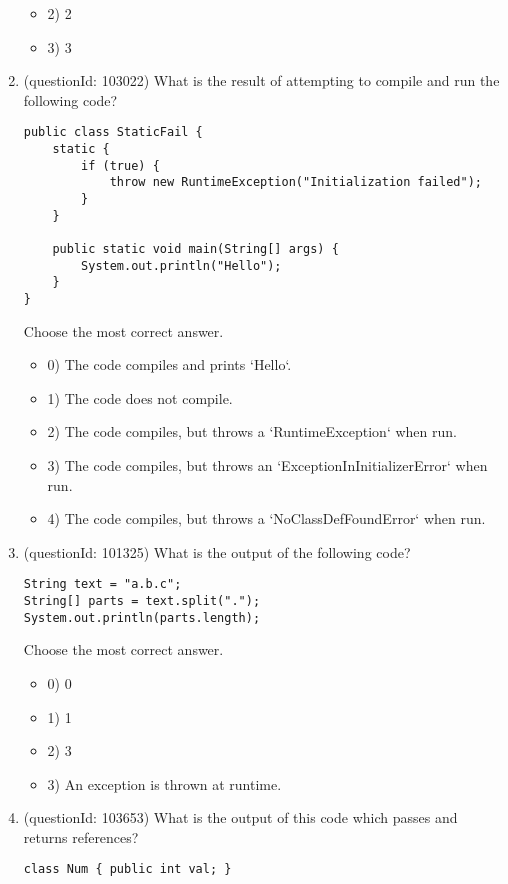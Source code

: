 \documentclass[12pt]{article}
\begin{document}
\begin{enumerate}[label=(\arabic*)]
\begin{itemize}
\item 2) 2

\item 3) 3

\end{itemize}
\item (questionId: 103022) What is the result of attempting to compile and run the following code?
\begin{verbatim}
public class StaticFail {
    static {
        if (true) {
            throw new RuntimeException("Initialization failed");
        }
    }

    public static void main(String[] args) {
        System.out.println("Hello");
    }
}
\end{verbatim}
Choose the most correct answer. 
\begin{itemize}
\item 0) The code compiles and prints `Hello`.

\item 1) The code does not compile.

\item 2) The code compiles, but throws a `RuntimeException` when run.

\item 3) The code compiles, but throws an `ExceptionInInitializerError` when run.

\item 4) The code compiles, but throws a `NoClassDefFoundError` when run.

\end{itemize}
\item (questionId: 101325) What is the output of the following code?
\begin{verbatim}
String text = "a.b.c";
String[] parts = text.split(".");
System.out.println(parts.length);
\end{verbatim}
Choose the most correct answer. 
\begin{itemize}
\item 0) 0

\item 1) 1

\item 2) 3

\item 3) An exception is thrown at runtime.

\end{itemize}
\item (questionId: 103653) What is the output of this code which passes and returns references?
\begin{verbatim}
class Num { public int val; }


\end{verbatim}
\end{enumerate}
\end{document}
